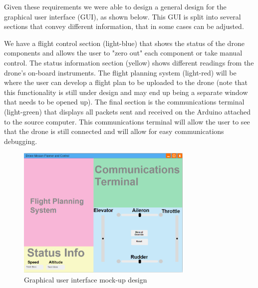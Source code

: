 \documentclass[12pt,a4paper]{article}
\begin{document}
Given these requirements we were able to design a general design for the graphical user interface (GUI), as shown below. This GUI is split into several sections that convey different information, that in some cases can be adjusted. 

We have a flight control section (light-blue) that shows the status of the drone components and allows the user to "zero out" each component or take manual control. The status information section (yellow) shows different readings from the drone's on-board instruments. The flight planning system (light-red) will be where the user can develop a flight plan to be uploaded to the drone (note that this functionality is still under design and may end up being a separate window that needs to be opened up). The final section is the communications terminal (light-green) that displays all packets sent and received on the Arduino attached to the source computer. This communications terminal will allow the user to see that the drone is still connected and will allow for easy communications debugging.

	\begin{figure}[h!]

  		\centering
    	\includegraphics[width=0.75\textwidth]{guiMockup.png}
   		\caption{Graphical user interface mock-up design}
	\end{figure}
\end{document}
